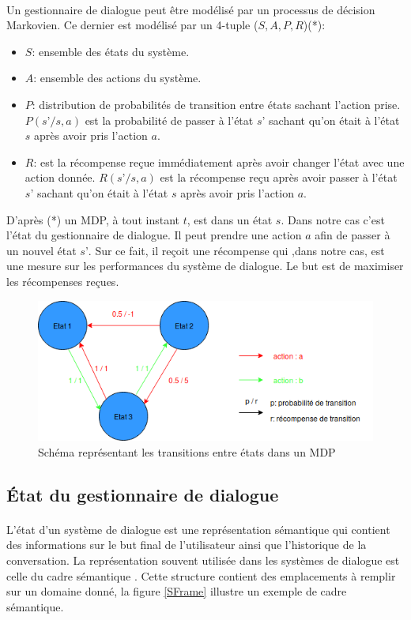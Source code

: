 	\paragraph{}Un gestionnaire de dialogue peut être modélisé par un processus de décision Markovien\cite{Bel1957}. Ce dernier est modélisé par un 4-tuple ($S,A,P,R$)(*):
	\begin{itemize}
		\item $S$: ensemble des états du système.
		\item $A$: ensemble des actions du système.
		\item $P$: distribution de probabilités de transition entre états sachant l’action prise. $P(s’/s,a)$ est la probabilité de passer à l’état $s’$ sachant qu’on était à l’état $s$ après avoir pris l’action $a$.
		\item $R$: est la récompense reçue immédiatement après avoir changer l’état avec une action donnée. $R(s’/s,a)$ est la récompense reçu après avoir passer à l’état $s’$ sachant qu’on était à l’état $s$ après avoir pris l’action $a$.
	\end{itemize}
	D’après (*) un MDP, à tout instant $t$, est dans un état $s$. Dans notre cas c’est l’état du gestionnaire de dialogue. Il peut prendre une action $a$ afin de passer à un nouvel état $s’$. Sur ce fait, il reçoit une récompense qui ,dans notre cas, est une mesure sur les performances du système de dialogue. Le but est de maximiser les récompenses reçues.
	
	\begin{figure}[H]
		\centering
		\includegraphics[width=.95\linewidth]{images/DM/MDP.png} 
		\caption{Schéma représentant les transitions entre états dans un MDP} 
	\end{figure}
	
	
	\subsection{État du gestionnaire de dialogue}
		\paragraph{}
		L’état d’un système de dialogue est une représentation sémantique qui contient des informations sur le but final de l’utilisateur ainsi que l’historique de la conversation. La représentation souvent utilisée dans les systèmes de dialogue est celle du cadre sémantique \cite{Chen2017}. Cette structure contient des emplacements à remplir sur un domaine donné, la figure \ref{SFrame} illustre un exemple de cadre sémantique.\newline
		
